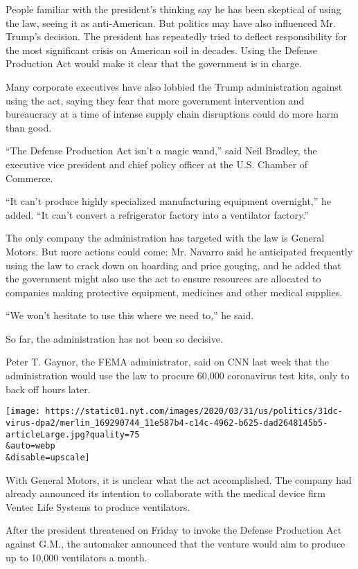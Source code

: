People familiar with the president's thinking say he has been skeptical
of using the law, seeing it as anti-American. But politics may have also
influenced Mr. Trump's decision. The president has repeatedly tried to
deflect responsibility for the most significant crisis on American soil
in decades. Using the Defense Production Act would make it clear that
the government is in charge.

Many corporate executives have also lobbied the Trump administration
against using the act, saying they fear that more government
intervention and bureaucracy at a time of intense supply chain
disruptions could do more harm than good.

``The Defense Production Act isn't a magic wand,'' said Neil Bradley,
the executive vice president and chief policy officer at the U.S.
Chamber of Commerce.

``It can't produce highly specialized manufacturing equipment
overnight,'' he added. ``It can't convert a refrigerator factory into a
ventilator factory.''

The only company the administration has targeted with the law is General
Motors. But more actions could come: Mr. Navarro said he anticipated
frequently using the law to crack down on hoarding and price gouging,
and he added that the government might also use the act to ensure
resources are allocated to companies making protective equipment,
medicines and other medical supplies.

``We won't hesitate to use this where we need to,'' he said.

So far, the administration has not been so decisive.

Peter T. Gaynor, the FEMA administrator, said on CNN last week that the
administration would use the law to procure 60,000 coronavirus test
kits, only to back off hours later.

\texttt{[image: https://static01.nyt.com/images/2020/03/31/us/politics/31dc-virus-dpa2/merlin\_169290744\_11e587b4-c14c-4962-b625-dad2648145b5-articleLarge.jpg?quality=75\\\&auto=webp\\\&disable=upscale]}

With General Motors, it is unclear what the act accomplished. The
company had already announced its intention to collaborate with the
medical device firm Ventec Life Systems to produce ventilators.

After the president threatened on Friday to invoke the Defense
Production Act against G.M., the automaker announced that the venture
would aim to produce up to 10,000 ventilators a month.

